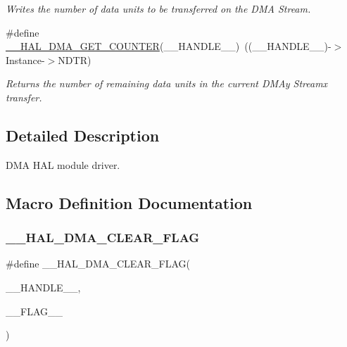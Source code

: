 \begin{DoxyCompactItemize}
\begin{DoxyCompactList}\small\item\em Writes the number of data units to be transferred on the D\+MA Stream. \end{DoxyCompactList}\item 
\#define \hyperlink{group___d_m_a_ga082d691311bac96641dc35a17cfe8e63}{\+\_\+\+\_\+\+H\+A\+L\+\_\+\+D\+M\+A\+\_\+\+G\+E\+T\+\_\+\+C\+O\+U\+N\+T\+ER}(\+\_\+\+\_\+\+H\+A\+N\+D\+L\+E\+\_\+\+\_\+)~((\+\_\+\+\_\+\+H\+A\+N\+D\+L\+E\+\_\+\+\_\+)-\/$>$Instance-\/$>$N\+D\+TR)
\begin{DoxyCompactList}\small\item\em Returns the number of remaining data units in the current D\+M\+Ay Streamx transfer. \end{DoxyCompactList}\end{DoxyCompactItemize}


\subsection{Detailed Description}
D\+MA H\+AL module driver. 



\subsection{Macro Definition Documentation}
\mbox{\label{group___d_m_a_gabc041fb1c85ea7a3af94e42470ef7f2a}} 
\subsubsection{\texorpdfstring{\+\_\+\+\_\+\+H\+A\+L\+\_\+\+D\+M\+A\+\_\+\+C\+L\+E\+A\+R\+\_\+\+F\+L\+AG}{\_\_HAL\_DMA\_CLEAR\_FLAG}}
{\footnotesize\ttfamily \#define \+\_\+\+\_\+\+H\+A\+L\+\_\+\+D\+M\+A\+\_\+\+C\+L\+E\+A\+R\+\_\+\+F\+L\+AG(\begin{DoxyParamCaption}\item[{}]{\+\_\+\+\_\+\+H\+A\+N\+D\+L\+E\+\_\+\+\_\+,  }\item[{}]{\+\_\+\+\_\+\+F\+L\+A\+G\+\_\+\+\_\+ }\end{DoxyParamCaption})}

